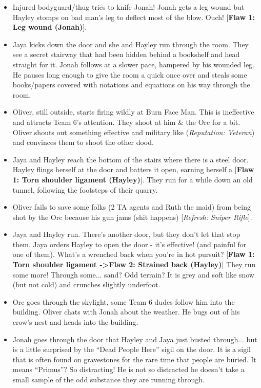 \begin{itemize}
\item Injured bodyguard/thug tries to knife Jonah!  Jonah gets a leg wound but Hayley stomps on bad man's leg to deflect most of the blow.  Ouch!  {[}\textbf{Flaw 1: Leg wound (Jonah)}{]}.
\item Jaya kicks down the door and she and Hayley run through the room.  They see a secret stairway that had been hidden behind a bookshelf and head straight for it.  Jonah follows at a slower pace, hampered by his wounded leg.   He pauses long enough to give the room a quick once over and steals some books/papers covered with notations and equations on his way through the room.  
\item Oliver, still outside, starts firing wildly at Burn Face Man.  This is ineffective and attracts Team 6's attention.  They shoot at him \& the Orc for a bit.  Oliver shouts out something effective and military like (\textit{Reputation: Veteran}) and convinces them to shoot the other dood. 
\item Jaya and Hayley reach the bottom of the stairs where there is a steel door.  Hayley flings herself at the door and batters it open, earning herself a {[}\textbf{Flaw 1: Torn shoulder ligament (Hayley)}{]}.  They run for a while down an old tunnel, following the footsteps of their quarry.  
\item Oliver fails to save some folks (2 TA agents and Ruth the maid) from being shot by the Orc because his gun jams (shit happens) {[}\textit{Refresh: Sniper Rifle}{]}.
\item Jaya and Hayley run.  There's another door, but they don't let that stop them.  Jaya orders Hayley to open the door - it's effective! (and painful for one of them).  What's a wrenched back when you're in hot pursuit?  {[}\textbf{Flaw 1: Torn shoulder ligament -\textgreater  Flaw 2: Strained back (Hayley)}{]}  They run some more!  Through some... sand?  Odd terrain?  It is grey and soft like snow (but not cold) and crunches slightly underfoot.
\item Orc goes through the skylight, some Team 6 dudes follow him into the building. Oliver chats with Jonah about the weather.  He bugs out of his crow's nest and heads into the building.
\item Jonah goes through the door that Hayley and Jaya just busted through...  but is a little surprised by the ``Dead People Here'' sigil on the door.  It is a sigil that is often found on gravestones for the rare time that people are buried.  It means ``Primus''?  So distracting!  He is not so distracted he doesn't take a small sample of the odd substance they are running through. 

\end{itemize}
